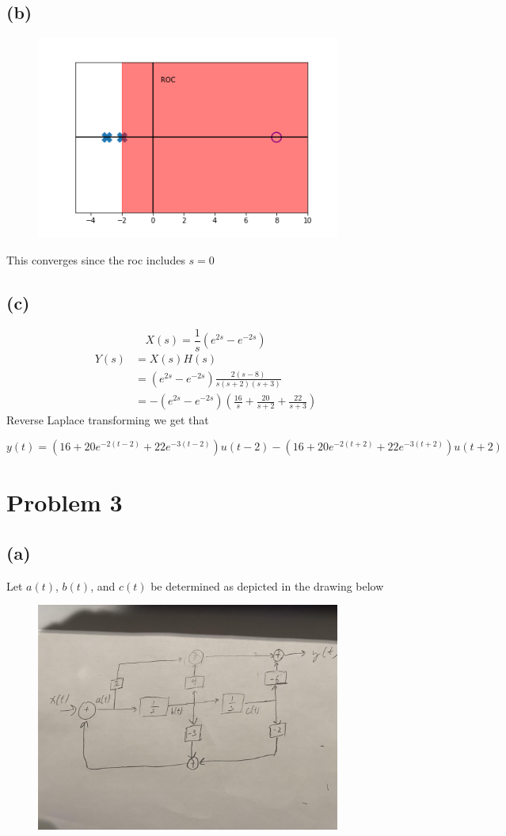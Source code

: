 \documentclass[12pt]{article}
\begin{document}
\subsection*{(b)}
\begin{center}
\begin{figure}[h]\includegraphics[width=10cm]{fig2}
\end{figure}
\end{center}
This converges since the roc includes $s=0$
\subsection*{(c)}
$$X(s)=\frac{1}{s}\left(e^{2s}-e^{-2s}\right)$$
\begin{align*}
Y(s)&=X(s)H(s)\\
&=\left(e^{2s}-e^{-2s}\right)\frac{2(s-8)}{s(s+2)(s+3)}\\
&=-\left(e^{2s}-e^{-2s}\right)\left(\frac{16}{s}+\frac{20}{s+2}+\frac{22}{s+3}\right)
\end{align*}
Reverse Laplace transforming we get that

$$y(t)=\boxed{\left(16+20e^{-2(t-2)}+22e^{-3(t-2)}\right)u(t-2)-\left(16+20e^{-2(t+2)}+22e^{-3(t+2)}\right)u(t+2)}$$
\section*{Problem 3}
\subsection*{(a)}
Let $a(t)$, $b(t)$, and $c(t)$ be determined as depicted in the drawing below
\begin{center}
\begin{figure}[h]\includegraphics[width=10cm]{fig3}
\end{figure}
\end{center}
\end{document}
